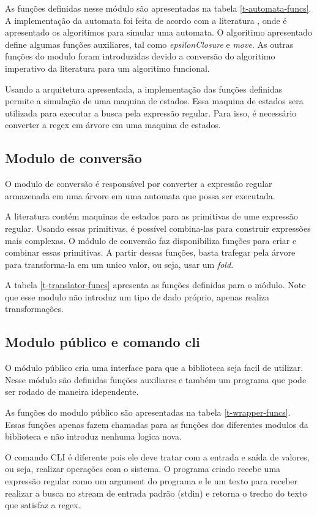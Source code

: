 As funções definidas nesse módulo são apresentadas na tabela \ref{t-automata-funcs}.
A implementação da automata foi feita de acordo com a literatura \cite{dragon-book}, onde é apresentado os algoritimos para simular uma automata.
O algoritimo apresentado define algumas funções auxiliares, tal como \emph{epsilonClosure} e \emph{move}.
As outras funções do modulo foram introduzidas devido a conversão do algoritimo imperativo da literatura para um algoritimo funcional.

Usando a arquitetura apresentada, a implementação das funções definidas permite a simulação de uma maquina de estados.
Essa maquina de estados sera utilizada para executar a busca pela expressão regular.
Para isso, é necessário converter a regex em árvore em uma maquina de estados.

\subsection{Modulo de conversão}

O modulo de conversão é responsável por converter a expressão regular armazenada em uma árvore em uma automata que possa ser executada.

A literatura contém maquinas de estados para as primitivas de ume expressão regular.
Usando essas primitivas, é possível combina-las para construir expressões mais complexas.
O módulo de conversão faz disponibiliza funções para criar e combinar essas primitivas.
A partir dessas funções, basta trafegar pela árvore para transforma-la em um unico valor, ou seja, usar um \emph{fold}.

A tabela \ref{t-translator-funcs} apresenta as funções definidas para o módulo.
Note que esse modulo não introduz um tipo de dado próprio, apenas realiza transformações.

\subsection{Modulo público e comando cli}
O módulo público cria uma interface para que a biblioteca seja facil de utilizar.
Nesse módulo são definidas funções auxiliares e também um programa que pode ser rodado de maneira idependente.

As funções do modulo público são apresentadas na tabela \ref{t-wrapper-funcs}.
Essas funções apenas fazem chamadas para as funções dos diferentes modulos da biblioteca e não introduz nenhuma logica nova.

O comando CLI é diferente pois ele deve tratar com a entrada e saída de valores, ou seja, realizar operações com o sistema.
O programa criado recebe uma expressão regular como um argument do programa e le um texto para receber realizar a busca no stream de entrada padrão (stdin) e retorna o trecho do texto que satisfaz a regex.

